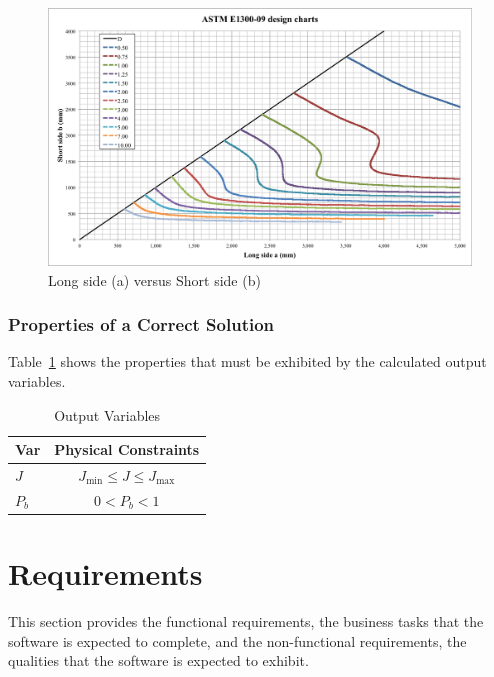 \documentclass[12pt]{article}
\begin{document}
\begin{figure}[h!]
  \begin{center}
    \includegraphics[width=\textwidth]{ASTM_E1300-09_design_charts.png}
    \caption{Long side (a) versus Short side (b)}
    \label{Fig_ASTM_E1300-09}
  \end{center}
\end{figure}
  
\subsubsection{Properties of a Correct Solution} \label{sec_CorrectSolution}

Table~\ref{TblOutputVar} shows the properties that must be exhibited by the
calculated output variables.

\begin{table}[!h]
\caption{Output Variables} \label{TblOutputVar}
\renewcommand{\arraystretch}{1.2}
\begin{center}
\begin{tabular}{l c} 
\toprule
\textbf{Var} & \textbf{Physical Constraints} \\
\midrule 
$J$&$J_{\text{min}} \leq J \leq J_{\text{max}}$\\
$P_b$ & $0 < P_b < 1$\\
\bottomrule
\end{tabular}
\end{center}
\end{table}

\section{Requirements} \label{sec_Reqs}  

This section provides the functional requirements, the business tasks that the
software is expected to complete, and the non-functional requirements, the
qualities that the software is expected to exhibit.
  
\end{document}
